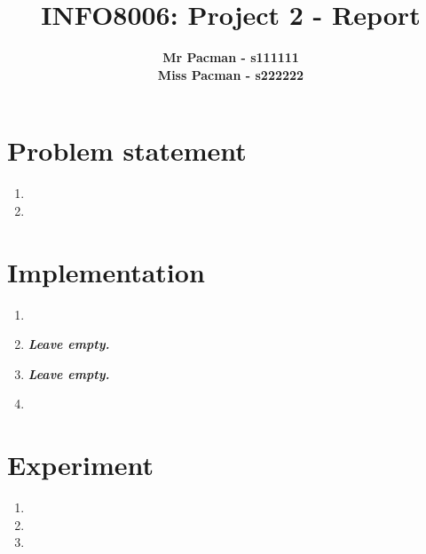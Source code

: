 \documentclass{article}
\begin{document}

\title{\Large{INFO8006: Project 2 - Report}}
\vspace{1cm}
\author{\small{\bf Mr Pacman - s111111} \\ \small{\bf Miss Pacman - s222222}}

\maketitle


\section{Problem statement}

\begin{enumerate}[label=\alph*.,leftmargin=*]
    \item
    \item
\end{enumerate}

\section{Implementation}

\begin{enumerate}[label=\alph*.,leftmargin=*]
    \item
    \item \textbf{\textit{Leave empty.}}
    \item \textbf{\textit{Leave empty.}}
    \item
\end{enumerate}

\section{Experiment}

\begin{enumerate}[label=\alph*.,leftmargin=*]
    \item
    \item
    \item
\end{enumerate}



\end{document}

